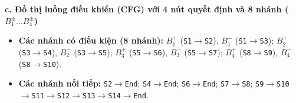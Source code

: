 \documentclass[11pt,a4paper]{article}
\begin{document}
\noindent\textbf{c. Đồ thị luồng điều khiển (CFG) với 4 nút quyết định và 8 nhánh ($B_1^\pm \dots B_4^\pm$)}
\begin{itemize}[leftmargin=1.2cm, noitemsep]
    \item[\textbf{--}] \textbf{Các nhánh có điều kiện (8 nhánh):} $B_1^+$ (\texttt{S1}$\rightarrow$\texttt{S2}), $B_1^-$ (\texttt{S1}$\rightarrow$\texttt{S3}); $B_2^+$ (\texttt{S3}$\rightarrow$\texttt{S4}), $B_2^-$ (\texttt{S3}$\rightarrow$\texttt{S5}); $B_3^+$ (\texttt{S5}$\rightarrow$\texttt{S6}), $B_3^-$ (\texttt{S5}$\rightarrow$\texttt{S7}); $B_4^+$ (\texttt{S8}$\rightarrow$\texttt{S9}), $B_4^-$ (\texttt{S8}$\rightarrow$\texttt{S10}).
    \item[\textbf{--}] \textbf{Các nhánh nối tiếp:} \texttt{S2}$\rightarrow$\texttt{End}; \texttt{S4}$\rightarrow$\texttt{End}; \texttt{S6}$\rightarrow$\texttt{End}; \texttt{S7}$\rightarrow$\texttt{S8}; \texttt{S9}$\rightarrow$\texttt{S10}$\rightarrow$\texttt{S11}$\rightarrow$\texttt{S12}$\rightarrow$\texttt{S13}$\rightarrow$\texttt{S14}$\rightarrow$\texttt{End}.
\end{itemize}
\end{document}
